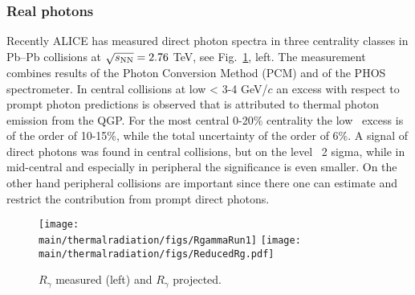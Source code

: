 \subsubsection{Real photons}

Recently ALICE has measured direct photon spectra in three centrality classes in Pb--Pb collisions at $\sqrt{s_{\rm NN}}=2.76$ TeV, see Fig.\ \ref{fig:RealPhotonsRg}, left. The measurement combines results of the Photon Conversion Method (PCM) and of the PHOS spectrometer. In central collisions at low \pT < 3-4 GeV/$c$ an excess with respect to prompt photon predictions is observed that is attributed to thermal photon emission from the QGP. For the most central 0-20\% centrality the low \pT \ excess is of the order of 10-15\%, while the total uncertainty of the order of 6\%. A signal of direct photons was found in central collisions, but on the level ~2 sigma, while in mid-central and especially in peripheral the significance is even smaller. On the other hand peripheral collisions are important since there one can estimate and restrict the contribution from prompt direct photons.  

\begin{figure}[hbt]
\centering
\texttt{[image: \\main/thermalradiation/figs/RgammaRun1]}
\hfill
\texttt{[image: \\main/thermalradiation/figs/ReducedRg.pdf]}
\caption{$R_{\gamma}$ measured (left) and $R_{\gamma}$ projected.}
\label{fig:RealPhotonsRg}
\end{figure}

